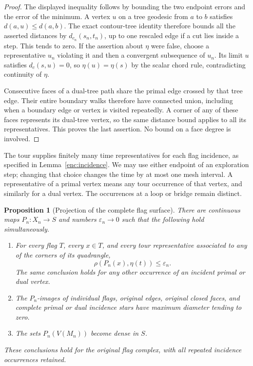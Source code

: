 \documentclass[11pt]{article}
\numberwithin{equation}{section}
\newtheorem{proposition}[theorem]{Proposition}
\theoremstyle{definition}
\theoremstyle{remark}
\newcommand{\1}{\mathbf 1}
\begin{document}
\begin{proof}
The displayed inequality follows by bounding the two endpoint errors and
the error of the minimum.  A vertex $u$ on a tree geodesic from $a$ to $b$
satisfies $d(a,u)\le d(a,b)$.  The exact contour-tree identity therefore
bounds all the asserted distances by
$d_{c_n}(s_n,t_n)$, up to one rescaled edge if a cut lies inside a step.
This tends to zero.  If the assertion about $\eta$ were false, choose a
representative $u_n$ violating it and then a convergent subsequence of
$u_n$.  Its limit $u$ satisfies $d_c(s,u)=0$, so
$\eta(u)=\eta(s)$ by the scalar chord rule, contradicting continuity of
$\eta$.

Consecutive faces of a dual-tree path share the primal edge crossed by
that tree edge.  Their entire boundary walks therefore have connected
union, including when a boundary edge or vertex is visited repeatedly.
A corner of any of these faces represents its dual-tree vertex, so the
same distance bound applies to all its representatives.  This proves
the last assertion.  No bound on a face degree is involved.
\end{proof}

The tour supplies finitely many time representatives for each flag
incidence, as specified in Lemma~\ref{enc:incidence}.  We may use
either endpoint of an exploration step; changing that choice changes the
time by at most one mesh interval.  A representative of a primal vertex
means any tour occurrence of that vertex, and similarly for a dual
vertex.  The occurrences at a loop or bridge remain distinct.

\begin{proposition}[Projection of the complete flag surface]
\label{top:projection}
There are continuous maps $P_n:X_n\to S$ and numbers
$\varepsilon_n\to0$ such that the following hold simultaneously.
\begin{enumerate}[label=(\roman*)]
\item For every flag $T$, every $x\in T$, and every tour representative
associated to any of the corners of its quadrangle,
\[
 \rho(P_n(x),\eta(t))\le\varepsilon_n.
\]
The same conclusion holds for any other occurrence of an incident primal
or dual vertex.
\item The $P_n$-images of individual flags, original edges, original
closed faces, and complete primal or dual incidence stars have maximum
diameter tending to zero.
\item The sets $P_n(V(M_n))$ become dense in $S$.
\end{enumerate}
These conclusions hold for the original flag complex, with all repeated
incidence occurrences retained.
\end{proposition}
\end{document}
